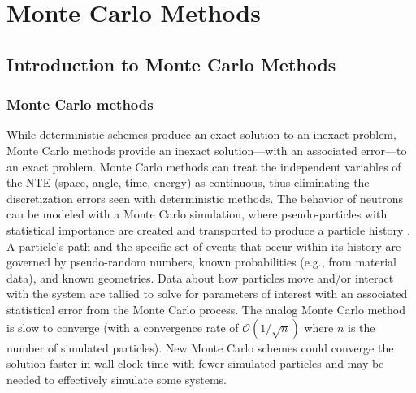 

\part{Monte Carlo Methods}

\chapter{Introduction to Monte Carlo Methods}


\section {Monte Carlo methods}


While deterministic schemes produce an exact solution to an inexact problem, Monte Carlo methods provide an inexact solution---with an associated error---to an exact problem.
Monte Carlo methods can treat the independent variables of the NTE (space, angle, time, energy) as continuous, thus eliminating the discretization errors seen with deterministic methods.
The behavior of neutrons can be modeled with a Monte Carlo simulation, where pseudo-particles with statistical importance are created and transported to produce a particle history \cite{lewis_computational_1984}.
A particle's path and the specific set of events that occur within its history are governed by pseudo-random numbers, known probabilities (e.g., from material data), and known geometries.
Data about how particles move and/or interact with the system are tallied to solve for parameters of interest with an associated statistical error from the Monte Carlo process. 
The analog Monte Carlo method is slow to converge (with a convergence rate of $\mathcal{O}(1/\sqrt{n})$ where $n$ is the number of simulated particles).
New Monte Carlo schemes could converge the solution faster in wall-clock time with fewer simulated particles and may be needed to effectively simulate some systems.


